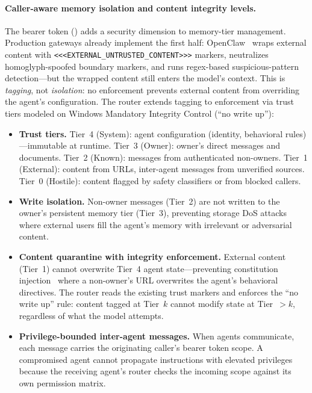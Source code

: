 \begin{opportunity}
\paragraph{Caller-aware memory isolation and content integrity levels.}
The bearer token () adds a security
dimension to memory-tier management.  Production gateways already
implement the first half: OpenClaw~\cite{openclaw2026} wraps external
content with \texttt{<<<EXTERNAL\_UNTRUSTED\_CONTENT>>>} markers,
neutralizes homoglyph-spoofed boundary markers, and runs regex-based
suspicious-pattern detection---but the wrapped content still enters the
model's context.  This is \emph{tagging}, not \emph{isolation}: no
enforcement prevents external content from overriding the agent's
configuration.  The router extends tagging to enforcement via trust
tiers modeled on Windows Mandatory Integrity Control (``no write up''):

\begin{itemize}[nosep]
  \item \textbf{Trust tiers.}  Tier~4 (System): agent configuration
        (identity, behavioral rules)---immutable at runtime.
        Tier~3 (Owner): owner's direct messages and documents.
        Tier~2 (Known): messages from authenticated non-owners.
        Tier~1 (External): content from URLs, inter-agent messages
        from unverified sources.
        Tier~0 (Hostile): content flagged by safety classifiers or
        from blocked callers.
  \item \textbf{Write isolation.}  Non-owner messages (Tier~2)
        are not written to the owner's persistent memory tier (Tier~3),
        preventing storage DoS attacks~\cite{agentschaos2025} where
        external users fill the agent's memory with irrelevant or
        adversarial content.
  \item \textbf{Content quarantine with integrity enforcement.}
        External content (Tier~1) cannot overwrite Tier~4 agent
        state---preventing constitution injection~\cite{agentschaos2025}
        where a non-owner's URL overwrites the agent's behavioral
        directives.  The router reads the existing trust markers and
        enforces the ``no write up'' rule: content tagged at Tier~$k$
        cannot modify state at Tier~$>k$, regardless of what the model
        attempts.
  \item \textbf{Privilege-bounded inter-agent messages.}  When agents
        communicate, each message carries the originating caller's
        bearer token scope.  A compromised agent cannot propagate
        instructions with elevated privileges because the receiving
        agent's router checks the incoming scope against its own
        permission matrix.
\end{itemize}


\end{opportunity}
